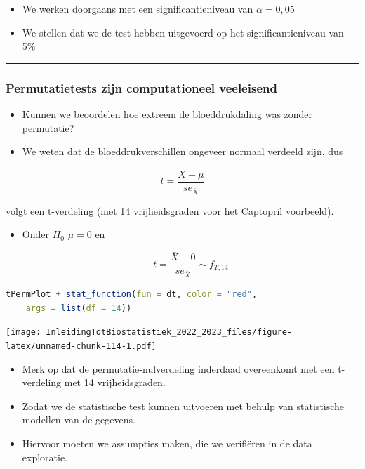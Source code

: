 \documentclass[
  12pt,dutch,coursenotes]{book}
\begin{document}
\begin{itemize}
\item
  We werken doorgaans met een significantieniveau van \(\alpha = 0,05\)
\item
  We stellen dat we de test hebben uitgevoerd op het significantieniveau van 5\%
\end{itemize}

\begin{center}\rule{0.5\linewidth}{0.5pt}\end{center}

\hypertarget{permutatietests-zijn-computationeel-veeleisend}{%
\subsubsection{Permutatietests zijn computationeel veeleisend}\label{permutatietests-zijn-computationeel-veeleisend}}

\begin{itemize}
\item
  Kunnen we beoordelen hoe extreem de bloeddrukdaling was zonder permutatie?
\item
  We weten dat de bloeddrukverschillen ongeveer normaal verdeeld zijn, dus
\end{itemize}

\[t=\frac{\bar X - \mu}{se_{\bar X}}\]

volgt een t-verdeling (met 14 vrijheidsgraden voor het Captopril voorbeeld).

\begin{itemize}
\item
  Onder \(H_0\) \(\mu=0\) en

  \[t=\frac{\bar X-0}{se_{\bar X}}\sim f_{T,14}\]
\end{itemize}

\begin{lstlisting}[language=R]
tPermPlot + stat_function(fun = dt, color = "red",
    args = list(df = 14))
\end{lstlisting}

\texttt{[image: InleidingTotBiostatistiek\_2022\_2023\_files/figure-latex/unnamed-chunk-114-1.pdf]}

\begin{itemize}
\item
  Merk op dat de permutatie-nulverdeling inderdaad overeenkomt met een t-verdeling met 14 vrijheidsgraden.
\item
  Zodat we de statistische test kunnen uitvoeren met behulp van statistische modellen van de gegevens.
\item
  Hiervoor moeten we assumpties maken, die we verifiëren in de data exploratie.
\end{itemize}
\end{document}
